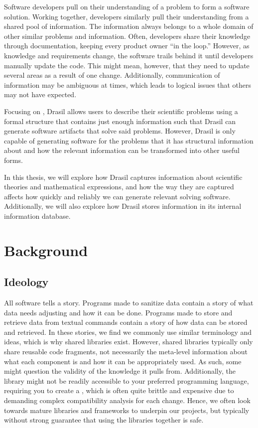 Software developers pull on their understanding of a problem to form a software
solution. Working together, developers similarly pull their understanding from a
shared pool of information. The information always belongs to a whole domain of
other similar problems and information. Often, developers share their knowledge
through documentation, keeping every product owner ``in the loop.'' However, as
knowledge and requirements change, the software trails behind it until
developers manually update the code. This might mean, however, that they need to
update several areas as a result of one change. Additionally, communication of
information may be ambiguous at times, which leads to logical issues that others
may not have expected.

Focusing on , Drasil allows users to describe their scientific problems
using a formal  structure that contains just enough information such
that Drasil can generate software artifacts that solve said problems. However,
Drasil is only capable of generating software for the problems that it has
structural information about and how the relevant information can be transformed
into other useful forms.

In this thesis, we will explore how Drasil captures information about scientific
theories and mathematical expressions, and how the way they are captured affects
how quickly and reliably we can generate relevant solving software.
Additionally, we will also explore how Drasil stores information in its internal
information database.

\section{Background}
\label{sec:intro:background}

\subsection[Ideology]{Ideology\footnotemark}


All software tells a story. Programs made to sanitize data contain a story of
what data needs adjusting and how it can be done. Programs made to store and
retrieve data from textual commands contain a story of how data can be stored
and retrieved. In these stories, we find we commonly use similar terminology and
ideas, which is why shared libraries exist. However, shared libraries typically
only share reusable code fragments, not necessarily the meta-level information
about what each component is and how it can be appropriately used. As such, some
might question the validity of the knowledge it pulls from. Additionally, the
library might not be readily accessible to your preferred programming language,
requiring you to create a , which is often quite brittle and expensive
due to demanding complex compatibility analysis for each change. Hence, we often
look towards mature libraries and frameworks to underpin our projects, but
typically without strong guarantee that using the libraries together is safe.

